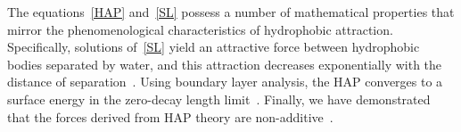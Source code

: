 The equations~\eqref{HAP} and~\eqref{SL} possess a number of
mathematical properties that mirror the phenomenological characteristics
of hydrophobic attraction. Specifically, solutions of~\eqref{SL} yield
an attractive force between hydrophobic bodies separated by water, and
this attraction decreases exponentially with the distance of
separation~\cite{Eriksson1989}. Using boundary layer analysis, the HAP
converges to a surface energy in the zero-decay length
limit~\cite{Lee2018, Lin2015, Shibata2004}. Finally, we have
demonstrated that the forces derived from HAP theory are
non-additive~\cite{Meyer2006, Fu2018_SIAM}. 

